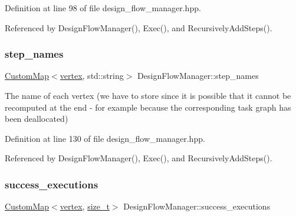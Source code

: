 Definition at line 98 of file design\+\_\+flow\+\_\+manager.\+hpp.



Referenced by Design\+Flow\+Manager(), Exec(), and Recursively\+Add\+Steps().

\mbox{\label{classDesignFlowManager_aab1b4d4f34b44e99076f1c8c0bef18f0}} 
\subsubsection{\texorpdfstring{step\+\_\+names}{step\_names}}
{\footnotesize\ttfamily \hyperlink{custom__map_8hpp_a18ca01763abbe3e5623223bfe5aaac6b}{Custom\+Map}$<$\hyperlink{graph_8hpp_abefdcf0544e601805af44eca032cca14}{vertex}, std\+::string$>$ Design\+Flow\+Manager\+::step\+\_\+names\hspace{0.3cm}{\ttfamily [private]}}



The name of each vertex (we have to store since it is possible that it cannot be recomputed at the end -\/ for example because the corresponding task graph has been deallocated) 



Definition at line 130 of file design\+\_\+flow\+\_\+manager.\+hpp.



Referenced by Design\+Flow\+Manager(), Exec(), and Recursively\+Add\+Steps().

\mbox{\label{classDesignFlowManager_aa583fc57e8f7514426a8b1891ae0bffd}} 
\subsubsection{\texorpdfstring{success\+\_\+executions}{success\_executions}}
{\footnotesize\ttfamily \hyperlink{custom__map_8hpp_a18ca01763abbe3e5623223bfe5aaac6b}{Custom\+Map}$<$\hyperlink{graph_8hpp_abefdcf0544e601805af44eca032cca14}{vertex}, \hyperlink{tutorial__fpt__2017_2intro_2sixth_2test_8c_a7c94ea6f8948649f8d181ae55911eeaf}{size\+\_\+t}$>$ Design\+Flow\+Manager\+::success\+\_\+executions\hspace{0.3cm}{\ttfamily [private]}}



